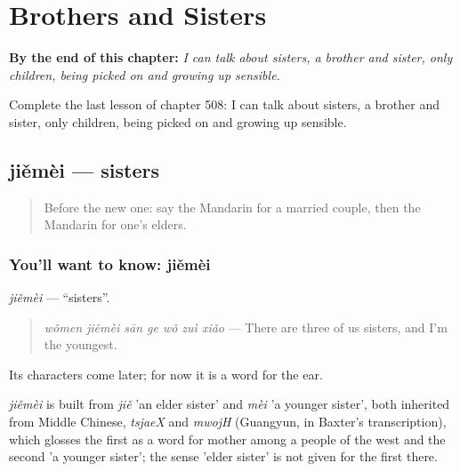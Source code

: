 
\chapter{Brothers and Sisters}
\label{ch:zh-brothers-and-sisters}

\begin{chapteropening}
\textbf{By the end of this chapter:} \emph{I can talk about sisters, a brother and sister, only children, being picked on and growing up sensible.}

Complete the last lesson of chapter 508: I can talk about sisters, a brother and sister, only children, being picked on and growing up sensible.
\end{chapteropening}

\section[jiěmèi]{jiěmèi — sisters}

\label{lesson:ZH-C508-jiemei}



\begin{quote}
Before the new one: say the Mandarin for a married couple, then the Mandarin for one's elders.
\end{quote}

\subsection*{You'll want to know: jiěmèi}
\emph{jiěmèi} — \textquotedblleft{}sisters\textquotedblright{}.

\begin{quote}
\emph{wǒmen jiěmèi sān ge wǒ zuì xiǎo} — There are three of us sisters, and I'm the youngest.
\end{quote}

Its characters come later; for now it is a word for the ear.

\begin{cousinweb}
\emph{jiěmèi} is built from \emph{jiě} 'an elder sister' and \emph{mèi} 'a younger sister', both inherited from Middle Chinese, \emph{tsjaeX} and \emph{mwojH} (Guangyun, in Baxter's transcription), which glosses the first as a word for mother among a people of the west and the second 'a younger sister'; the sense 'elder sister' is not given for the first there.
\end{cousinweb}

